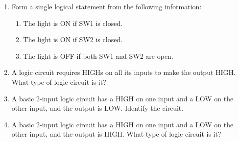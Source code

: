 \documentclass[11pt]{article}
\begin{document}
\begin{enumerate}
\begin{center}

\vspace{0.10cm}

\textbf{FIGURE 1--62}
\end{center}



\begin{center}
    {\large \textbf{Section 1--3 Basic Logic Functions}}
\end{center}



\item Form a single logical statement from the following information:

\begin{enumerate}[label=(\alph*)]
    \item The light is ON if SW1 is closed.
    \item The light is ON if SW2 is closed.
    \item The light is OFF if both SW1 and SW2 are open.
\end{enumerate}


\item A logic circuit requires HIGHs on all its inputs to make the output HIGH.
What type of logic circuit is it?


\item A basic 2-input logic circuit has a HIGH on one input and a LOW on the other
input, and the output is LOW. Identify the circuit.


\item A basic 2-input logic circuit has a HIGH on one input and a LOW on the other
input, and the output is HIGH. What type of logic circuit is it?

\end{enumerate}
\end{document}
